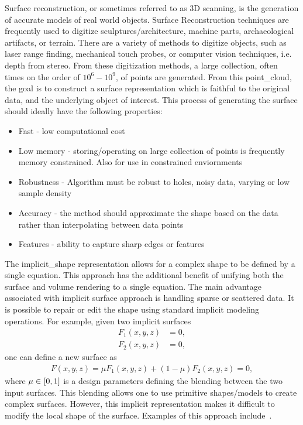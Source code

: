 Surface reconstruction, or sometimes referred to as 3D scanning, is the generation of accurate models of real world objects.
Surface Reconstruction techniques are frequently used to digitize sculptures/architecture, machine parts, archaeological artifacts, or terrain.
There are a variety of methods to digitize objects, such as laser range finding, mechanical touch probes, or computer vision techniques, i.e. depth from stereo.
From these digitization methods, a large collection, often times on the order of \( 10^6 - 10^9\), of points are generated.
From this \gls{point_cloud}, the goal is to construct a surface representation which is faithful to the original data, and the underlying object of interest.
This process of generating the surface should ideally have the following properties:
\begin{itemize}
    \item Fast - low computational cost
    \item Low memory - storing/operating on large collection of points is frequently memory constrained. Also for use in constrained enviornments
    \item Robustness - Algorithm must be robust to holes, noisy data, varying or low sample density
    \item Accuracy - the method should approximate the shape based on the data rather than interpolating between data points
    \item Features - ability to capture sharp edges or features
\end{itemize}


The \gls{implicit_shape} representation allows for a complex shape to be defined by a single equation.
This approach has the additional benefit of unifying both the surface and volume rendering to a single equation.
The main advantage associated with implicit surface approach is handling sparse or scattered data.
It is possible to repair or edit the shape using standard implicit modeling operations.
For example, given two implicit surfaces
\begin{align*}
    F_1(x, y, z) &= 0, \\
    F_2(x, y, z) &= 0 ,
\end{align*}
one can define a new surface as
\begin{align*}
    F(x, y, z) = \mu F_1(x, y, z) + (1-\mu) F_2(x,y,z) = 0,
\end{align*}
where \( \mu \in \left[ 0, 1 \right]\) is a design parameters defining the blending between the two input surfaces.
This blending allows one to use primitive shapes/models to create complex surfaces.
However, this implicit representation makes it difficult to modify the local shape of the surface. 
Examples of this approach include~\cite{bolitho2009,hoppe1992,ohtake2005}.

